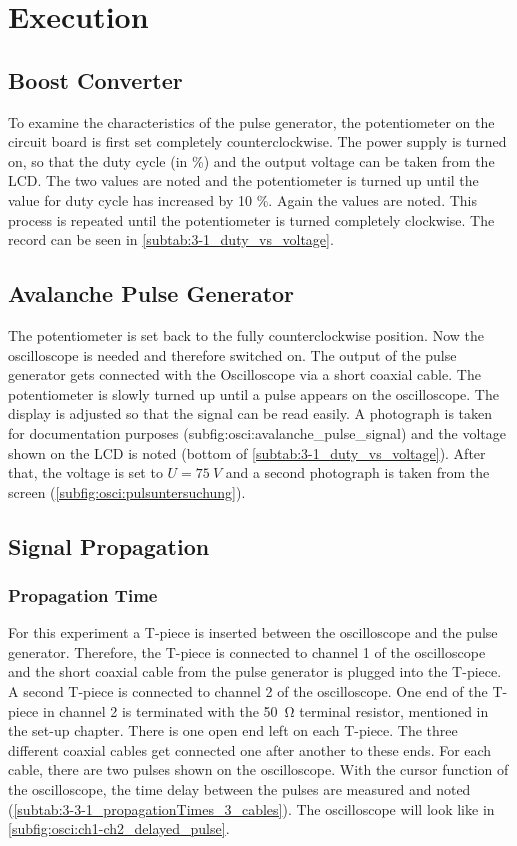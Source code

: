 \chapter{Execution}
    \section{Boost Converter}
        To examine the characteristics of the pulse generator, the potentiometer on the circuit board is first set completely
        counterclockwise. The power supply is turned on, so that the duty cycle (in \%) and the output voltage can be taken from
        the LCD. The two values are noted and the potentiometer is turned up until the value for duty cycle has increased by 10 \%.
        Again the values are noted. This process is repeated until the potentiometer is turned completely clockwise. The record can be seen in \cref{subtab:3-1_duty_vs_voltage}.
    \section{Avalanche Pulse Generator}
        The potentiometer is set back to the fully counterclockwise position. Now the oscilloscope is needed and therefore
        switched on. The output of the pulse generator gets connected with the Oscilloscope via a short coaxial cable. The
        potentiometer is slowly turned up until a pulse appears on the oscilloscope. The display is adjusted so that the signal
        can be read easily. A photograph is taken for documentation purposes (subfig:osci:avalanche_pulse_signal) and the voltage shown on the LCD is noted (bottom of \cref{subtab:3-1_duty_vs_voltage}). After
        that, the voltage is set to \(U = \SI{75}{V}\) and a second photograph is taken from the screen (\cref{subfig:osci:pulsuntersuchung}).
    \section{Signal Propagation}
        \subsection{Propagation Time}
            For this experiment a T-piece is inserted between the oscilloscope and the pulse generator. Therefore, the T-piece is
            connected to channel 1 of the oscilloscope and the short coaxial cable from the pulse generator is plugged into the
            T-piece. A second T-piece is connected to channel 2 of the oscilloscope. One end of the T-piece in channel 2 is terminated
            with the \SI{50}{\ohm} terminal resistor, mentioned in the set-up chapter. There is one open end left on each T-piece.
            The three different coaxial cables get connected one after another to these ends. For each cable, there are two pulses
            shown on the oscilloscope. With the cursor function of the oscilloscope, the time delay between the pulses are measured
            and noted (\cref{subtab:3-3-1_propagationTimes_3_cables}). The oscilloscope will look like in \cref{subfig:osci:ch1-ch2_delayed_pulse}.
